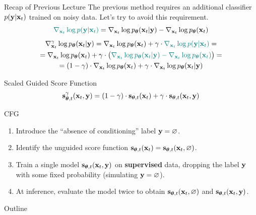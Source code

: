 \documentclass{beamer}
\begin{document}
\begin{frame}{Recap of Previous Lecture}
	The previous method requires an additional classifier $p(\mathbf{y} | \mathbf{x}_t)$ trained on noisy data. Let's try to avoid this requirement.
	\[
		{\color{teal}\nabla_{\mathbf{x}_t} \log p(\mathbf{y} | \mathbf{x}_t)} =  \nabla_{\mathbf{x}_t} \log p_{\boldsymbol{\theta}}(\mathbf{x}_t| \mathbf{y}) -\nabla_{\mathbf{x}_t} \log  p_{\boldsymbol{\theta}}(\mathbf{x}_t)
	\]
	\vspace{-0.9cm}
	\begin{multline*}
		\nabla_{\mathbf{x}_t}^{\gamma} \log p_{\boldsymbol{\theta}}(\mathbf{x}_t | \mathbf{y}) = \nabla_{\mathbf{x}_t} \log p_{\boldsymbol{\theta}}(\mathbf{x}_t) + \gamma \cdot {\color{teal} \nabla_{\mathbf{x}_t} \log p(\mathbf{y}| \mathbf{x}_t)} = \\
		= \nabla_{\mathbf{x}_t} \log p_{\boldsymbol{\theta}}(\mathbf{x}_t) + \gamma \cdot \bigl( {\color{teal}\nabla_{\mathbf{x}_t} \log p_{\boldsymbol{\theta}}(\mathbf{x}_t| \mathbf{y}) - \nabla_{\mathbf{x}_t} \log  p_{\boldsymbol{\theta}}(\mathbf{x}_t)} \bigr) = \\
		=  (1 - \gamma) \cdot  \nabla_{\mathbf{x}_t} \log p_{\boldsymbol{\theta}}(\mathbf{x}_t) + \gamma \cdot  \nabla_{\mathbf{x}_t} \log p_{\boldsymbol{\theta}}(\mathbf{x}_t| \mathbf{y})
	\end{multline*}
	\vspace{-0.7cm}
	\begin{block}{Scaled Guided Score Function}
		\vspace{-0.3cm}
		\[
			\mathbf{s}^{\gamma}_{\boldsymbol{\theta}, t}(\mathbf{x}_t, \mathbf{y}) = (1 - \gamma) \cdot \mathbf{s}_{\boldsymbol{\theta}, t}(\mathbf{x}_t) +  \gamma \cdot \mathbf{s}_{\boldsymbol{\theta}, t}(\mathbf{x}_t, \mathbf{y})
		\]
		\vspace{-0.5cm}
	\end{block}
	\vspace{-0.3cm}
	\begin{block}{CFG}
		\begin{enumerate}
			\item Introduce the ``absence of conditioning'' label $\mathbf{y} = \varnothing$.
			\item Identify the unguided score function $\mathbf{s}_{\boldsymbol{\theta}, t}(\mathbf{x}_t) = \mathbf{s}_{\boldsymbol{\theta}, t}(\mathbf{x}_t, \varnothing)$.
			\item Train a single model $\mathbf{s}_{\boldsymbol{\theta}, t}(\mathbf{x}_t, \mathbf{y})$ on \textbf{supervised} data, dropping the label $\mathbf{y}$ with some fixed probability (simulating $\mathbf{y} = \varnothing$).
			\item At inference, evaluate the model twice to obtain $\mathbf{s}_{\boldsymbol{\theta}, t}(\mathbf{x}_t, \varnothing)$ and $\mathbf{s}_{\boldsymbol{\theta}, t}(\mathbf{x}_t, \mathbf{y})$.
		\end{enumerate}
	\end{block}
\end{frame}
\begin{frame}{Outline}
	\tableofcontents
\end{frame}
\end{document}
